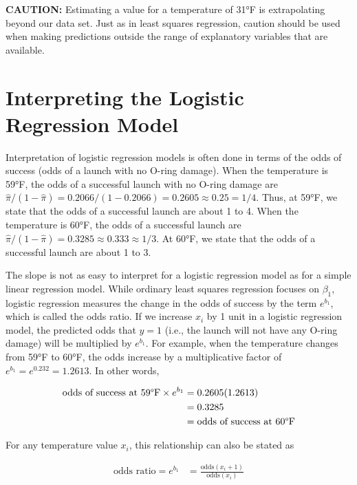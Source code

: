 \documentclass[
]{report}
\begin{document}
\large

\textbf{CAUTION:} Estimating a value for a temperature of 31°F is extrapolating beyond our data set. Just as in least squares regression, caution should be used when making predictions outside the range of explanatory variables that are available.
\normalsize

\section{\texorpdfstring{\textbf{Interpreting the Logistic Regression Model}}{Interpreting the Logistic Regression Model}}\label{interpreting-the-logistic-regression-model}

Interpretation of logistic regression models is often done in terms of the odds of success (odds of a launch with no O-ring damage). When the temperature is 59°F, the odds of a successful launch with no O-ring damage are \(\hat\pi/(1 - \hat\pi) = 0.2066/(1 - 0.2066) = 0.2605 \approx 0.25 = 1/4\). Thus, at 59°F, we state that the odds of a successful launch are about 1 to 4. When the temperature is 60°F, the odds of a successful launch are \(\hat\pi/(1 - \hat\pi) = 0.3285 \approx 0.333 \approx 1/3\). At 60°F, we state that the odds of a successful launch are about 1 to 3.

The slope is not as easy to interpret for a logistic regression model as for a simple linear regression model. While ordinary least squares regression focuses on \(\beta_1\), logistic regression measures the change in the odds of success by the term \(e^{b_1}\), which is called the odds ratio. If we increase \(x_i\) by 1 unit in a logistic regression model, the predicted odds that \(y = 1\) (i.e., the launch will not have any O-ring damage) will be multiplied by \(e^{b_1}\). For example, when the temperature changes from 59°F to 60°F, the odds increase by a multiplicative factor of \(e^{b_1} = e^{0.232} = 1.2613\). In other words,

\begin{align}
\text{odds of success at 59°F} \times e^{b_1} 
&= 0.2605(1.2613) \notag \\
&= 0.3285 \notag \\
&= \text{odds of success at 60°F} \notag
\end{align}

For any temperature value \(x_i\), this relationship can also be stated as

\begin{align}
\text{odds ratio} = e^{b_1} &= \frac{\text{odds}(x_i + 1)}{\text{odds}(x_i)} \tag{7.10}
\end{align}
\end{document}
